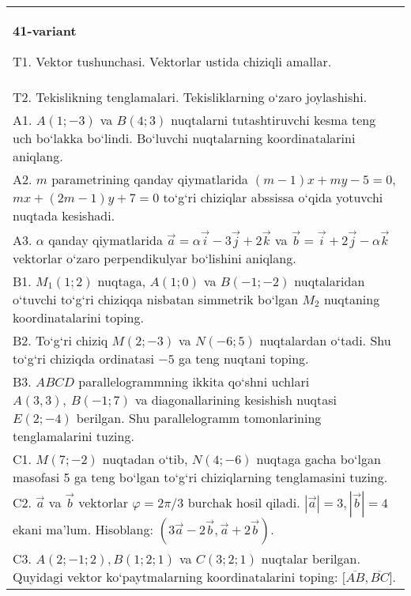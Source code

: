 \documentclass{article}
\begin{document}
\begin{tabular}{m{17cm}}
\textbf{41-variant}

T1. 
Vektor tushunchasi. Vektorlar ustida chiziqli amallar.
 \\
T2. 
Tekislikning tenglamalari. Tekisliklarning o‘zaro joylashishi.
 \\
A1. 
$A (1;-3) $ va $B (4;3) $ nuqtalarni tutashtiruvchi
kesma teng uch bo‘lakka bo‘lindi. Bo‘luvchi nuqtalarning koordinatalarini
aniqlang.
 \\
A2. 
$m$ parametrining qanday qiymatlarida
$ (m-1) x+my-5=0$, $mx+ (2m-1) y+7=0$ to‘g‘ri chiziqlar abssissa
o‘qida yotuvchi nuqtada kesishadi.
 \\
A3. 
$\alpha$
qanday qiymatlarida 
$\overrightarrow{a} = \alpha\overrightarrow{i} - 3\overrightarrow{j} + 2\overrightarrow{k}$
va
$\overrightarrow{b} = \overrightarrow{i} + 2\overrightarrow{j} - \alpha\overrightarrow{k}$
vektorlar o‘zaro perpendikulyar bo‘lishini aniqlang.
 \\
B1. 
\(M_{1} (1;2) \) nuqtaga, \(A (1;0) \) va \(B (-1;-2) \)
nuqtalaridan o‘tuvchi to‘g‘ri chiziqqa nisbatan simmetrik bo‘lgan \(M_{2}\) nuqtaning koordinatalarini toping.
 \\
B2. 
To‘g‘ri chiziq \(M (2;-3) \) va \(N (-6;5) \) nuqtalardan o‘tadi.
Shu to‘g‘ri chiziqda ordinatasi $-5$ ga teng nuqtani toping.
 \\
B3. 
$ABCD$ parallelogrammning ikkita qo‘shni uchlari
\(A (3,3),\ B (-1;7) \) va diagonallarining kesishish nuqtasi
\(E (2;-4) \) berilgan. Shu parallelogramm tomonlarining tenglamalarini
tuzing.
 \\
C1. 
\(M (7;-2) \) nuqtadan o‘tib, \(N (4;-6) \) nuqtaga
gacha bo‘lgan masofasi 5 ga teng bo‘lgan to‘g‘ri chiziqlarning tenglamasini tuzing.
 \\
C2. 
$\vec{a}$ va $\vec{b}$ vektorlar $\varphi = 2\pi/3$ burchak hosil qiladi. $|\vec{a}| = 3,|\vec{b}| = 4$ ekani ma’lum. Hisoblang:
$\left(3\vec{a} - 2\vec{b},\vec{a} + 2\vec{b} \right) $.
 \\
C3. 
$A (2; -1;2),B (1;2; 1) $ va $C (3;2;1)$ nuqtalar berilgan. Quyidagi vektor ko‘paytmalarning koordinatalarini toping:
$\lbrack\overline{AB},\overline{BC}\rbrack$.
 \\

\end{tabular}
\vspace{1cm}
\end{document}
